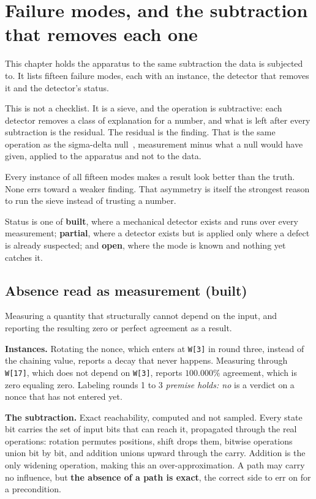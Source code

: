 \chapter{Failure modes, and the subtraction that removes each one}

This chapter holds the apparatus to the same subtraction the data is subjected to. It lists fifteen failure modes, each with an instance, the detector that removes it and the detector's status.

This is not a checklist. It is a sieve, and the operation is subtractive: each detector removes a class of explanation for a number, and what is left after every subtraction is the residual. The residual is the finding. That is the same operation as the sigma-delta null~\cite{src:Quigg-delta-null}, measurement minus what a null would have given, applied to the apparatus and not to the data.

Every instance of all fifteen modes makes a result look better than the truth. None errs toward a weaker finding. That asymmetry is itself the strongest reason to run the sieve instead of trusting a number.

Status is one of \textbf{built}, where a mechanical detector exists and runs over every measurement; \textbf{partial}, where a detector exists but is applied only where a defect is already suspected; and \textbf{open}, where the mode is known and nothing yet catches it.

\section{Absence read as measurement (built)}

Measuring a quantity that structurally cannot depend on the input, and reporting the resulting zero or perfect agreement as a result.

\textbf{Instances.} Rotating the nonce, which enters at \texttt{W[3]} in round three, instead of the chaining value, reports a decay that never happens. Measuring through \texttt{W[17]}, which does not depend on \texttt{W[3]}, reports \(100.000\%\) agreement, which is zero equaling zero. Labeling rounds 1 to 3 \emph{premise holds: no} is a verdict on a nonce that has not entered yet.

\textbf{The subtraction.} Exact reachability, computed and not sampled. Every state bit carries the set of input bits that can reach it, propagated through the real operations: rotation permutes positions, shift drops them, bitwise operations union bit by bit, and addition unions upward through the carry. Addition is the only widening operation, making this an over-approximation. A path may carry no influence, but \textbf{the absence of a path is exact}, the correct side to err on for a precondition.

